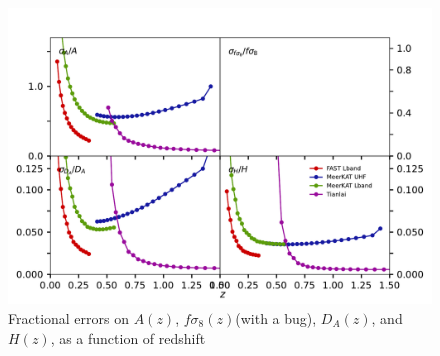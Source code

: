 \documentclass[UTF8]{beamer}
\begin{document}
    \begin{frame}
        \frametitle{}
        \begin{figure}
            \centering
            \includegraphics[scale=0.4]{fig06-zfns-FMT.pdf}
            \caption{Fractional errors on $A(z)$, $f\sigma_8(z)$(with a bug), $D_A(z)$, and $H(z)$, as a function of redshift}
        \end{figure}
    \end{frame}
\end{document}

